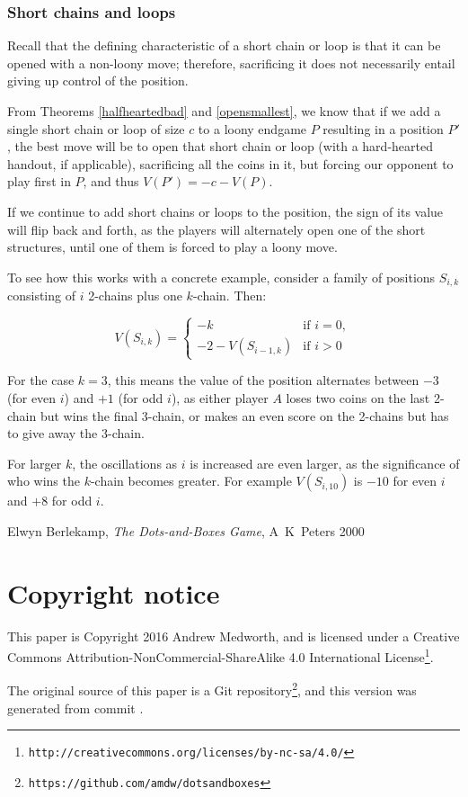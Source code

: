 \documentclass[a4paper,twocolumn]{article}
\begin{document}
\subsubsection{Short chains and loops}

Recall that the defining characteristic of a short chain or loop is
that it can be opened with a non-loony move; therefore, sacrificing it
does not necessarily entail giving up control of the position.

From Theorems \ref{halfheartedbad} and \ref{opensmallest}, we know
that if we add a single short chain or loop of size $c$ to a loony
endgame $P$ resulting in a position $P'$, the best move will be to
open that short chain or loop (with a hard-hearted handout, if
applicable), sacrificing all the coins in it, but forcing our opponent
to play first in $P$, and thus $V(P') = -c-V(P)$.

If we continue to add short chains or loops to the position, the sign
of its value will flip back and forth, as the players will alternately
open one of the short structures, until one of them is forced to play
a loony move.

To see how this works with a concrete example, consider a family of
positions $S_{i,k}$ consisting of $i$ 2-chains plus one
$k$-chain. Then:

\begin{equation*}
  V(S_{i,k}) =
  \begin{cases}
    -k & \text{if } i = 0,\\
    -2-V(S_{i-1,k}) & \text{if } i > 0
  \end{cases}
\end{equation*}

For the case $k=3$, this means the value of the position alternates
between $-3$ (for even $i$) and $+1$ (for odd $i$), as either player
$A$ loses two coins on the last 2-chain but wins the final 3-chain, or
makes an even score on the 2-chains but has to give away the 3-chain.

For larger $k$, the oscillations as $i$ is increased are even larger,
as the significance of who wins the $k$-chain becomes greater. For
example $V(S_{i,10})$ is $-10$ for even $i$ and $+8$ for odd $i$.

\begin{thebibliography}{99}
   Elwyn Berlekamp, \emph{The Dots-and-Boxes Game},
    A~K~Peters 2000
\end{thebibliography}

\section*{Copyright notice}

This paper is Copyright 2016 Andrew Medworth, and is licensed under a
Creative Commons Attribution-NonCommercial-ShareAlike 4.0
International
License\footnote{\texttt{http://creativecommons.org/licenses/by-nc-sa/4.0/}}.

 The original source of this paper is a Git
repository\footnote{\texttt{https://github.com/amdw/dotsandboxes}},
and this version was generated from commit \VCRevisionMod.
\end{document}
